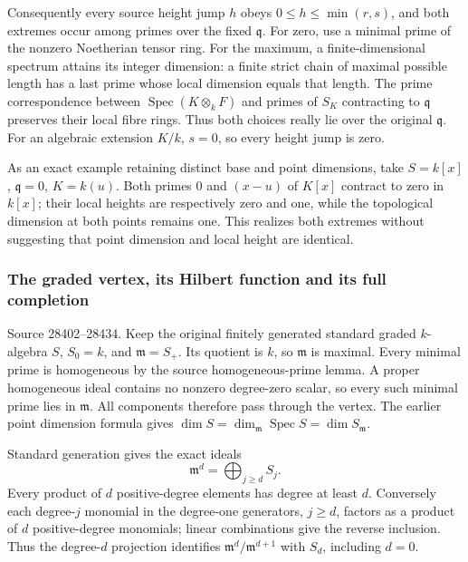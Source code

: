 Consequently every source height jump \(h\) obeys \(0\leq h\leq\min(r,s)\), and both extremes occur among primes over the fixed \(\mathfrak q\). For zero, use a minimal prime of the nonzero Noetherian tensor ring. For the maximum, a finite-dimensional spectrum attains its integer dimension: a finite strict chain of maximal possible length has a last prime whose local dimension equals that length. The prime correspondence between \(\operatorname{Spec}(K\otimes_kF)\) and primes of \(S_K\) contracting to \(\mathfrak q\) preserves their local fibre rings. Thus both choices really lie over the original \(\mathfrak q\). For an algebraic extension \(K/k\), \(s=0\), so every height jump is zero.

As an exact example retaining distinct base and point dimensions, take \(S=k[x]\), \(\mathfrak q=0\), \(K=k(u)\). Both primes \(0\) and \((x-u)\) of \(K[x]\) contract to zero in \(k[x]\); their local heights are respectively zero and one, while the topological dimension at both points remains one. This realizes both extremes without suggesting that point dimension and local height are identical.

\subsubsection{The graded vertex, its Hilbert function and its full completion}\label{the-graded-vertex-its-hilbert-function-and-its-full-completion}

Source 28402--28434. Keep the original finitely generated standard graded \(k\)-algebra \(S\), \(S_0=k\), and \(\mathfrak m=S_+\). Its quotient is \(k\), so \(\mathfrak m\) is maximal. Every minimal prime is homogeneous by the source homogeneous-prime lemma. A proper homogeneous ideal contains no nonzero degree-zero scalar, so every such minimal prime lies in \(\mathfrak m\). All components therefore pass through the vertex. The earlier point dimension formula gives \(\dim S=\dim_{\mathfrak m}\operatorname{Spec}S=\dim S_{\mathfrak m}\).

Standard generation gives the exact ideals \[
 \mathfrak m^d=\bigoplus_{j\geq d}S_j.
\] Every product of \(d\) positive-degree elements has degree at least \(d\). Conversely each degree-\(j\) monomial in the degree-one generators, \(j\geq d\), factors as a product of \(d\) positive-degree monomials; linear combinations give the reverse inclusion. Thus the degree-\(d\) projection identifies \(\mathfrak m^d/\mathfrak m^{d+1}\) with \(S_d\), including \(d=0\).

